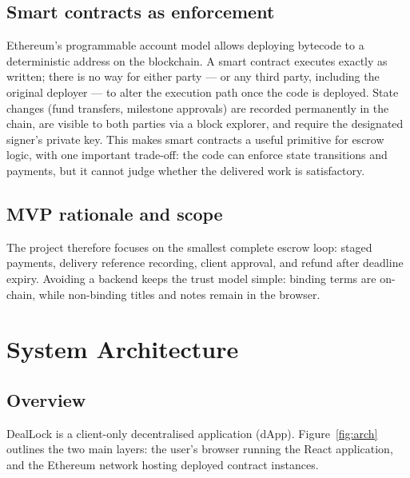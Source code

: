 \documentclass[12pt,a4paper]{article}
\begin{document}
\subsection{Smart contracts as enforcement}

Ethereum's programmable account model allows deploying bytecode to a
deterministic address on the blockchain.
A smart contract executes exactly as written; there is no way for either party
--- or any third party, including the original deployer --- to alter the execution
path once the code is deployed.
State changes (fund transfers, milestone approvals) are recorded permanently in
the chain, are visible to both parties via a block explorer, and require the
designated signer's private key.
This makes smart contracts a useful primitive for escrow logic, with one
important trade-off: the code can enforce state transitions and payments, but it
cannot judge whether the delivered work is satisfactory.

\subsection{MVP rationale and scope}

The project therefore focuses on the smallest complete escrow loop: staged
payments, delivery reference recording, client approval, and refund after
deadline expiry. Avoiding a backend keeps the trust model simple: binding terms
are on-chain, while non-binding titles and notes remain in the browser.

\newpage
\section{System Architecture}
\label{sec:architecture}

\subsection{Overview}

DealLock is a client-only decentralised application (dApp).
Figure~\ref{fig:arch} outlines the two main layers: the user's browser running
the React application, and the Ethereum network hosting deployed contract instances.
\end{document}
